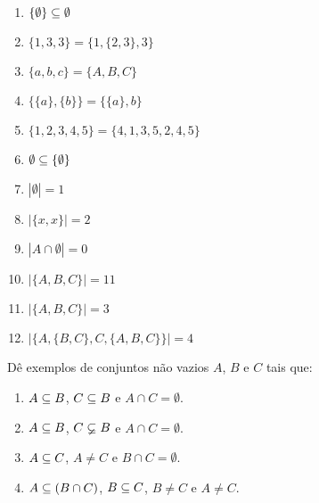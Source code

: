 \documentclass[12pt]{exam}
\begin{document}
\begin{multicols}{2}
\begin{enumerate}[label={\arabic*})]
            \item $\{\emptyset\} \subseteq \emptyset$

            \item $\{1, 3, 3\} = \{1, \{2, 3\}, 3\}$

            \item $\{a, b, c\} = \{A, B, C\}$

            \item $\{\{a\}, \{b\}\} = \{\{a\}, b\}$

            \item $\{1, 2, 3, 4, 5\} = \{4, 1, 3, 5, 2, 4, 5\}$

            \item $\emptyset \subseteq \{\emptyset\}$

            \item $|\emptyset| = 1$

            \item $|\{x,x\}| = 2$

            \item $|A \cap \emptyset | = 0$

            \item $|\{A, B, C\}| = 11$

            \item $|\{A, B, C\}| = 3$

            \item $|\{A, \{B, C\}, C, \{A, B, C\}\}| = 4$

        \end{enumerate}
    \end{multicols}

    \questao{} D\^e exemplos de conjuntos n\~ao vazios $A$, $B$ e $C$ tais que:
    \begin{enumerate}[label={\alph*})]
        \item $A \subseteq B$, $C \subseteq B$ e $A \cap C = \emptyset$.

        \item $A \subseteq B$, $C \varsubsetneq B$ e $A \cap C = \emptyset$.

        \item $A \subseteq C$, $A \ne C$ e $B \cap C = \emptyset$.

        \item $A \subseteq (B \cap C)$, $B \subseteq C$, $B \ne C$ e $A \ne C$.
    \end{enumerate}

    \vspace{.3cm}
\end{document}
